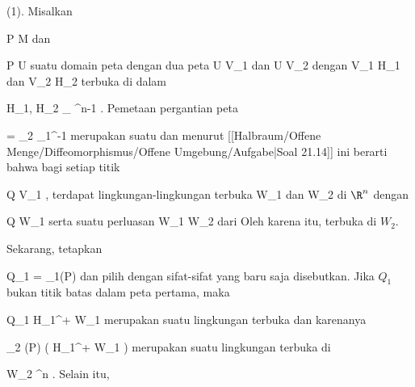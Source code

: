{

\teilbeweis {}{}{}
{(1). Misalkan

\mavergleichskette
{\vergleichskette
{ P
}
{ \in }{ M
}
{  }{
}
{    }{
}
{   }{
}
}
{}{}{}
dan

\mavergleichskette
{\vergleichskette
{ P
}
{ \in }{ U
}
{  }{
}
{    }{
}
{   }{
}
}
{}{}{}
suatu domain peta dengan dua peta
 { U } { V_1
} {}
dan
 { U } { V_2
} {}
dengan
\mathkor {} {V_1 \subseteq H_1} {dan} {V_2 \subseteq H_2} {}
terbuka di dalam

\mavergleichskette
{\vergleichskette
{ H_1, H_2
}
{ \cong }{ \R_{} \times \R^{n-1}
}
{  }{
}
{    }{
}
{   }{
}
}
{}{}{.}
Pemetaan pergantian peta

\mavergleichskette
{\vergleichskette
{ \varphi
}
{ = }{ \alpha_2 \circ \alpha_1^{-1}
}
{  }{
}
{    }{
}
{   }{
}
}
{}{}{}
merupakan suatu
dan menurut [[Halbraum/Offene Menge/Diffeomorphismus/Offene Umgebung/Aufgabe|Soal 21.14]] ini berarti bahwa bagi setiap titik

\mavergleichskette
{\vergleichskette
{ Q
}
{ \in }{ V_1
}
{  }{
}
{    }{
}
{   }{
}
}
{}{}{,}
terdapat lingkungan-lingkungan terbuka
\mathkor {} {W_1} {dan} {W_2} {}
di $\R^n$ dengan

\mavergleichskette
{\vergleichskette
{ Q
}
{ \in }{ W_1
}
{  }{
}
{    }{
}
{   }{
}
}
{}{}{}
serta suatu perluasan
\maabbdisp {\tilde{\varphi}} {W_1 } { W_2
} {}
dari
 Oleh karena itu,
 terbuka di $W_2$.

Sekarang, tetapkan

\mavergleichskette
{\vergleichskette
{ Q_1
}
{ = }{ \alpha_1(P)
}
{  }{
}
{    }{
}
{   }{
}
}
{}{}{}
dan pilih
 dengan sifat-sifat yang baru saja disebutkan. Jika $Q_1$ bukan titik batas dalam peta pertama, maka

\mavergleichskette
{\vergleichskette
{ Q_1
}
{ \in }{ H_1^+ \cap W_1
}
{  }{
}
{    }{
}
{   }{
}
}
{}{}{}
merupakan suatu lingkungan terbuka dan karenanya

\mavergleichskette
{\vergleichskette
{ \alpha_2 (P)
}
{ \in }{ \tilde{\varphi} \left(  H_1^+ \cap W_1  \right)
}
{  }{
}
{    }{
}
{   }{
}
}
{}{}{}
merupakan suatu lingkungan terbuka di

\mavergleichskette
{\vergleichskette
{ W_2
}
{ \subseteq }{ \R^n
}
{  }{
}
{    }{
}
{   }{
}
}
{}{}{.}
Selain itu,

}}
